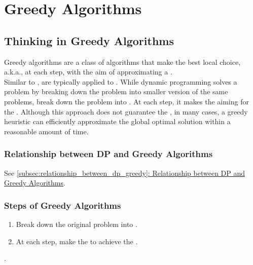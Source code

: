 \chapter{Greedy Algorithms}
\section{Thinking in Greedy Algorithms}
Greedy algorithms are a class of algorithms that make the best local choice, a.k.a., {\color{blue}{greedy choice}} at each step, with the aim of approximating a {\color{blue}{global optimum}}.\\

Similar to {\color{blue}{dynamic programming}}, {\color{blue}{greedy algorithms}} are typically applied to {\color{blue}{optimization problems}}. While {\color{blue}{dynamic programming}} dynamic programming solves a problem by breaking down the problem into smaller version of the same problems,  {\color{blue}{greedy algorithms}} break down the problem into {\color{blue}{a series of consistent steps}}. At each step, it makes the {\color{blue}{greedy choice}} aiming for the {\color{blue}{local optimum}}. Although this approach does not guarantee the {\color{blue}{global optimum}}, in many cases, a greedy heuristic can efficiently approximate the global optimal solution within a reasonable amount of time.

\subsection{Relationship between DP and Greedy Algorithms}
See \hyperref[subsec:relationship_between_dp_greedy]{\ref{subsec:relationship_between_dp_greedy}: Relationship between DP and Greedy Algorithms}.

\subsection{Steps of Greedy Algorithms}
\begin{enumerate}
	\item Break down the original problem into {\color{blue}{a series of consistent steps}}.
	\item At each step, make the {\color{blue}{greedy choice}} to achieve the {\color{blue}{local optimum}}.
\end{enumerate}

\hdashrule[0.5ex]{\linewidth}{0.5pt}{1mm 3pt}
\begin{center}
{\color{magenta}{In this chapter, the greedy part of each solution will be highlighted in magenta}}.
\end{center}
\hdashrule[0.5ex]{\linewidth}{0.5pt}{1mm 3pt}

